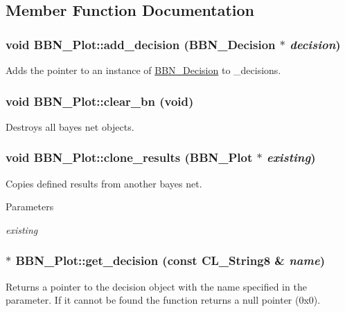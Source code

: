 \subsection{Member Function Documentation}
\hypertarget{classBBN__Plot_a7d7efcce2bd7fa7599f2bf6db57b8bdc}{
\subsubsection[{add\_\-decision}]{\setlength{\rightskip}{0pt plus 5cm}void BBN\_\-Plot::add\_\-decision ({\bf BBN\_\-Decision} $\ast$ {\em decision})}}
\label{classBBN__Plot_a7d7efcce2bd7fa7599f2bf6db57b8bdc}
Adds the pointer to an instance of \hyperlink{classBBN__Decision}{BBN\_\-Decision} to \_\-decisions. \hypertarget{classBBN__Plot_a04269d854d91d36d29f4297915f16e84}{
\subsubsection[{clear\_\-bn}]{\setlength{\rightskip}{0pt plus 5cm}void BBN\_\-Plot::clear\_\-bn (void)}}
\label{classBBN__Plot_a04269d854d91d36d29f4297915f16e84}
Destroys all bayes net objects. \hypertarget{classBBN__Plot_afbaf527d64694381a4e334b312cec999}{
\subsubsection[{clone\_\-results}]{\setlength{\rightskip}{0pt plus 5cm}void BBN\_\-Plot::clone\_\-results ({\bf BBN\_\-Plot} $\ast$ {\em existing})}}
\label{classBBN__Plot_afbaf527d64694381a4e334b312cec999}
Copies defined results from another bayes net.


\begin{DoxyParams}{Parameters}
\item[{\em existing}]\end{DoxyParams}
\hypertarget{classBBN__Plot_ad32d5c77cfd6d8578745993a60c35f06}{
\subsubsection[{get\_\-decision}]{ $\ast$ BBN\_\-Plot::get\_\-decision (const CL\_\-String8 \& {\em name})}}
\label{classBBN__Plot_ad32d5c77cfd6d8578745993a60c35f06}
Returns a pointer to the decision object with the name specified in the parameter. If it cannot be found the function returns a null pointer (0x0).

